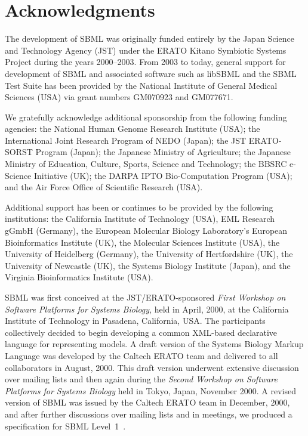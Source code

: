 
\section{Acknowledgments}
\label{sec:acknowledgements}
\label{sec:acknowledgments}

The development of SBML was originally funded entirely by the
Japan Science and Technology Agency (JST) under the ERATO Kitano
Symbiotic Systems Project during the years 2000--2003.  From 2003
to today, general support for development of SBML and associated
software such as libSBML and the SBML Test Suite has been provided
by the National Institute of General Medical Sciences (USA) via
grant numbers GM070923 and GM077671.

We gratefully acknowledge additional sponsorship from the
following funding agencies: the National Human Genome Research
Institute (USA); the International Joint Research Program of NEDO
(Japan); the JST ERATO-SORST Program (Japan); the Japanese
Ministry of Agriculture; the Japanese Ministry of Education,
Culture, Sports, Science and Technology; the BBSRC e-Science
Initiative (UK); the DARPA IPTO Bio-Computation Program (USA); and
the Air Force Office of Scientific Research (USA).

Additional support has been or continues to be provided by the
following institutions: the California Institute of Technology
(USA), EML Research gGmbH (Germany), the European Molecular
Biology Laboratory's European Bioinformatics Institute (UK), the
Molecular Sciences Institute (USA), the University of Heidelberg
(Germany), the University of Hertfordshire (UK), the University of
Newcastle (UK), the Systems Biology Institute (Japan), and the
Virginia Bioinformatics Institute (USA).

SBML was first conceived at the JST/ERATO-sponsored \emph{First
  Workshop on Software Platforms for Systems Biology}, held in
April, 2000, at the California Institute of Technology in
Pasadena, California, USA.  The participants collectively decided
to begin developing a common XML-based declarative language for
representing models.  A draft version of the Systems Biology
Markup Language was developed by the Caltech ERATO team and
delivered to all collaborators in August, 2000.  This draft
version underwent extensive discussion over mailing lists and then
again during the \emph{Second Workshop on Software Platforms for
  Systems Biology} held in Tokyo, Japan, November 2000.  A revised
version of SBML was issued by the Caltech ERATO team in December,
2000, and after further discussions over mailing lists and in
meetings, we produced a specification for SBML
Level~1~\citep{hucka:2001}.

